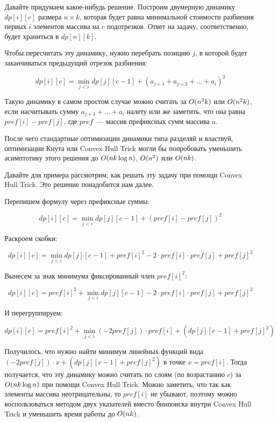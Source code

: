 Давайте придумаем какое-нибудь решение. Построим двумерную динамику $dp[i][c]$ размера $n \times k$, которая будет равна минимальной стоимости разбиения первых $i$ элементов массива на $c$ подотрезков. Ответ на задачу, соответственно, будет храниться в $dp[n][k]$.

Чтобы пересчитать эту динамику, нужно перебрать позицию $j$, в которой будет заканчиваться предыдущий отрезок разбиения:

$$dp[i][c] = \min \limits_{j < i} dp[j][c - 1] + (a_{j + 1} + a_{j + 2} + \ldots + a_i)^2$$

Такую динамику в самом простом случае можно считать за $O(n^3 k)$ или $O(n^2 k)$, если насчитывать сумму $a_{j + 1} + \ldots + a_i$ налету или же заметить, что она равна $pref[i] - pref[j]$, где $pref$~--- массив префиксных сумм массива $a$.

После чего стандартные оптимизации динамики типа разделяй и властвуй, оптимизации Кнута или Convex Hull Trick могли бы попробовать уменьшить асимптотику этого решения до $O(n k \log n)$, $O(n^2)$ или $O(nk)$.

Давайте для примера рассмотрим, как решать эту задачу при помощи Convex Hull Trick. Это решение понадобится нам далее.

Перепишем формулу через префиксные суммы:

$$dp[i][c] = \min \limits_{j < i} dp[j][c - 1] + (pref[i] - pref[j])^2$$

Раскроем скобки:

$$dp[i][c] = \min \limits_{j < i} dp[j][c - 1] + pref[i]^2 - 2 \cdot pref[i] \cdot pref[j] + pref[j]^2$$

Вынесем за знак минимума фиксированный член $pref[i]^2$:

$$dp[i][c] = pref[i]^2 + \min \limits_{j < i} dp[j][c - 1] - 2 \cdot pref[i] \cdot pref[j] + pref[j]^2$$

И перегруппируем:

$$dp[i][c] = pref[i]^2 + \min \limits_{j < i} (-2 pref[j]) \cdot pref[i] + (dp[j][c - 1] + pref[j]^2)$$

Получилось, что нужно найти минимум линейных функций вида $(-2pref[j]) \cdot x + (dp[j][c - 1] + pref[j]^2)$ в точке $x = pref[i]$. Тогда получается, что эту динамику можно считать по слоям (по возрастанию $c$) за $O(n k \log n)$ при помощи Convex Hull Trick. Можно заметить, что так как элементы массива неотрицательны, то $pref[i]$ не убывают, поэтому можно воспользоваться методом двух указателей вместо бинпоиска внутри Convex Hull Trick и уменьшить время работы до $O(n k)$.

